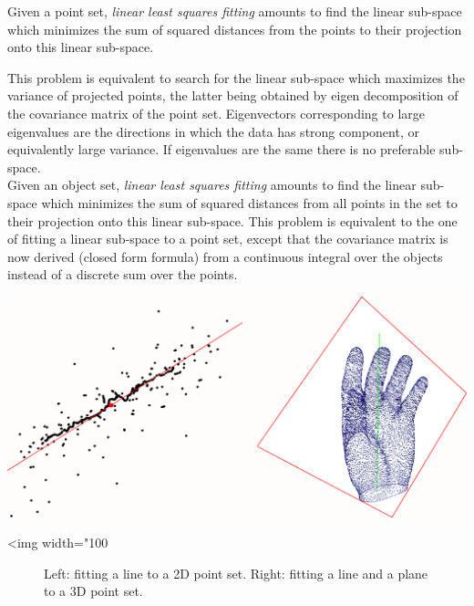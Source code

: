 Given a point set, \emph{linear least squares fitting} amounts to find the linear sub-space which minimizes the sum of squared distances from the points to their projection onto this linear sub-space. 

This problem is equivalent to search for the linear sub-space which maximizes the variance of projected points, the latter being obtained by eigen decomposition of the covariance matrix of the point set. Eigenvectors corresponding to large eigenvalues are the
directions in which the data has strong component, or equivalently large variance. If eigenvalues are the same there is no preferable sub-space.\\

Given an object set, \emph{linear least squares fitting} amounts to find the linear sub-space which minimizes the sum of squared distances from all points in the set to their projection onto this linear sub-space. This problem is equivalent to the one of fitting a linear sub-space to a point set, except that the covariance matrix is now derived (closed form formula) from a continuous integral over the objects instead of a discrete sum over the points.


\begin{center}
    \label{fit}
    \begin{ccTexOnly}
      \includegraphics[width=1.0\textwidth]{Principal_component_analysis/fit}
    \end{ccTexOnly}
    \begin{ccHtmlOnly}
        <img width="100%
    \end{ccHtmlOnly}
    \begin{figure}[h]
        \caption{Left: fitting a line to a 2D point set.
                 Right: fitting a line and a plane to a 3D point set.}
    \end{figure}
\end{center}

